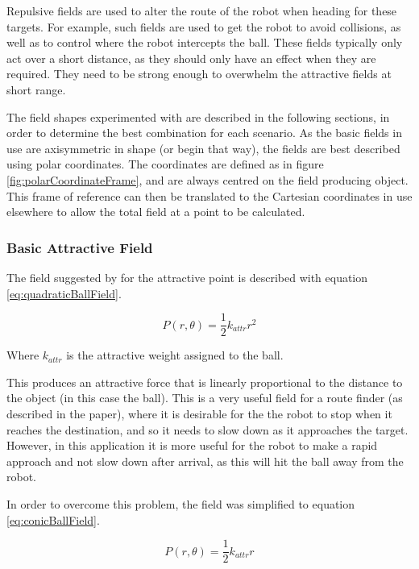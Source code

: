 \documentclass[10pt]{article} \usepackage[a4paper]{geometry}
\begin{document}
Repulsive fields are used to alter the route of the robot when heading for these
targets. For example, such fields are used to get the robot to avoid collisions,
as well as to control where the robot intercepts the ball. These fields
typically only act over a short distance, as they should only have an effect
when they are required. They need to be strong enough to overwhelm the
attractive fields at short range.

The field shapes experimented with are described in the following sections, in
order to determine the best combination for each scenario. As the basic fields
in use are axisymmetric in shape (or begin that way), the fields are best
described using polar coordinates. The coordinates are defined as in figure
\ref{fig:polarCoordinateFrame}, and are always centred on the field producing
object. This frame of reference can then be translated to the Cartesian
coordinates in use elsewhere to allow the total field at a point to be
calculated.

\subsubsection{Basic Attractive Field\label{sub:Basic-Attractive-Field}}

The field suggested by \cite{intelligentAlgorithmPathPlanning} for the
attractive point is described with equation \ref{eq:quadraticBallField}.

\begin{equation}
P(r,\theta)=\frac{1}{2}k_{attr}r^{2}\label{eq:quadraticBallField}
\end{equation}

Where $k_{attr}$ is the attractive weight assigned to the ball.

This produces an attractive force that is linearly proportional to the distance
to the object (in this case the ball). This is a very useful field for a route
finder (as described in the paper), where it is desirable for the the robot to
stop when it reaches the destination, and so it needs to slow down as it
approaches the target. However, in this application it is more useful for the
robot to make a rapid approach and not slow down after arrival, as this will hit
the ball away from the robot.

In order to overcome this problem, the field was simplified to equation
\ref{eq:conicBallField}.

\begin{equation}
P(r,\theta)=\frac{1}{2}k_{attr}r\label{eq:conicBallField}
\end{equation}
\end{document}
